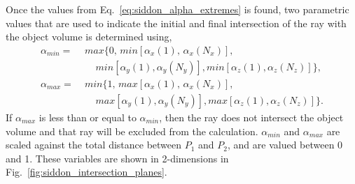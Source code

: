 Once the values from Eq.~\ref{eq:siddon_alpha_extremes} is found, two parametric values that are used to indicate the initial and final intersection of the ray with the object volume is determined using,
%
\begin{equation}
\begin{aligned}
\alpha_{min} = \; & max\{ 0, \, min \left[ \alpha_x(1), \, \alpha_x(N_x) \right], \\
               & \; \; \; \; min \left[ \alpha_y(1), \alpha_y(N_y) \right], min \left[ \alpha_z(1), \alpha_z (N_z) \right] \}, \\
\alpha_{max} = \; & min\{1, \, max \left[ \alpha_x(1), \, \alpha_x(N_x) \right], \\
			   & \; \; \; \; max \left[ \alpha_y(1), \alpha_y(N_y) \right], max \left[ \alpha_z(1), \alpha_z (N_z) \right] \}.
\end{aligned}
\label{eq:siddon_alpha_min_max}
\end{equation}
%
If $\alpha_{max}$ is less than or equal to $\alpha_{min}$, then the ray does not intersect the object volume and that ray will be excluded from the calculation.  $\alpha_{min}$ and $\alpha_{max}$ are scaled against the total distance between $P_1$ and $P_2$, and are valued between 0 and 1.  These variables are shown in 2-dimensions in Fig.~\ref{fig:siddon_intersection_planes}.

